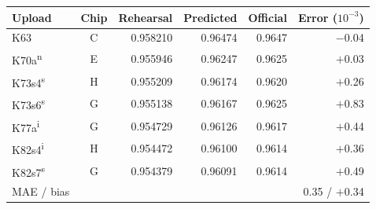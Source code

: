 {\small
\begin{tabular}{@{}lcrrrr@{}}
\toprule
Upload & Chip & Rehearsal & Predicted & Official & Error ($10^{-3}$) \\
\midrule
K63 & C & 0.958210 & 0.96474 & 0.9647 & \ensuremath{-}0.04 \\
K70a\textsuperscript{n} & E & 0.955946 & 0.96247 & 0.9625 & \ensuremath{+}0.03 \\
K73s4\textsuperscript{s} & H & 0.955209 & 0.96174 & 0.9620 & \ensuremath{+}0.26 \\
K73s6\textsuperscript{s} & G & 0.955138 & 0.96167 & 0.9625 & \ensuremath{+}0.83 \\
K77a\textsuperscript{i} & G & 0.954729 & 0.96126 & 0.9617 & \ensuremath{+}0.44 \\
K82s4\textsuperscript{i} & H & 0.954472 & 0.96100 & 0.9614 & \ensuremath{+}0.36 \\
K82s7\textsuperscript{s} & G & 0.954379 & 0.96091 & 0.9614 & \ensuremath{+}0.49 \\
\midrule
MAE / bias & & & & & 0.35 / \ensuremath{+}0.34 \\
\bottomrule
\end{tabular}
}
